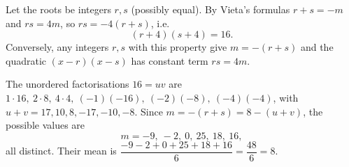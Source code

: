 Let the roots be integers \(r,s\) (possibly equal). By Vieta's formulas \(r+s=-m\) and \(rs=4m\), so \(rs=-4(r+s)\), i.e.
\[
(r+4)(s+4)=16 .
\]
Conversely, any integers \(r,s\) with this property give \(m=-(r+s)\) and the quadratic \((x-r)(x-s)\) has constant term \(rs=4m\).

The unordered factorisations \(16=uv\) are \(1\cdot16,\ 2\cdot8,\ 4\cdot4,\ (-1)(-16),\ (-2)(-8),\ (-4)(-4)\), with \(u+v=17,10,8,-17,-10,-8\). Since \(m=-(r+s)=8-(u+v)\), the possible values are
\[
m=-9,\ -2,\ 0,\ 25,\ 18,\ 16,
\]
all distinct. Their mean is \(\dfrac{-9-2+0+25+18+16}{6}=\dfrac{48}{6}=\boxed{8}\).

